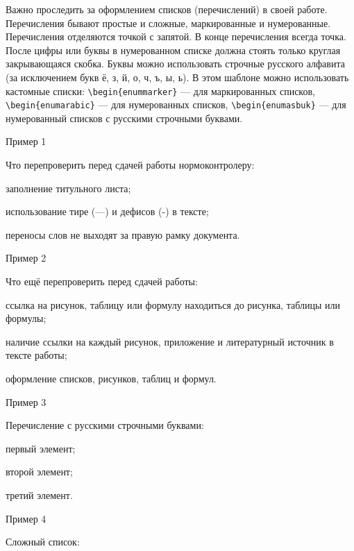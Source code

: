 \documentclass{report}
\begin{document}
Важно проследить за оформлением списков (перечислений) в своей работе. Перечисления бывают простые и сложные, маркированные и нумерованные. Перечисления отделяются точкой с запятой. В конце перечисления всегда точка. После цифры или буквы в нумерованном списке должна стоять только круглая закрывающаяся скобка. Буквы можно использовать строчные русского алфавита (за исключением букв ё, з, й, о, ч, ъ, ы, ь).
В этом шаблоне можно использовать кастомные списки: \verb|\begin{enummarker}| --- для маркированных списков, \break \verb|\begin{enumarabic}| --- для нумерованных списков, \verb|\begin{enumasbuk}| --- для нумерованный списков с русскими строчными буквами.

Пример 1

Что перепроверить перед сдачей работы нормоконтролеру:
\begin{enummarker}
\item заполнение титульного листа;
\item использование тире (---) и дефисов (-) в тексте;
\item переносы слов не выходят за правую рамку документа. 
\end{enummarker}

Пример 2

Что ещё перепроверить перед сдачей работы:
\begin{enumarabic}
  \item ссылка на рисунок, таблицу или формулу находиться до рисунка, таблицы или формулы;
  \item наличие ссылки на каждый рисунок, приложение и литературный источник в тексте работы;
  \item оформление списков, рисунков, таблиц и формул.
\end{enumarabic}

\hfill\break %
\hfill\break
\hfill\break

Пример 3

Перечисление с русскими строчными буквами:
\begin{enumasbuk}
  \item первый элемент;
  \item второй элемент;
  \item третий элемент.
\end{enumasbuk}

Пример 4

Сложный список:
\end{document}
